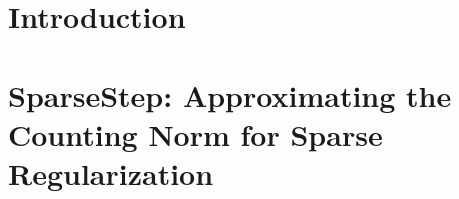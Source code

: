 \documentclass[a5paper, 11pt, openright]{book}
\begin{document}
\chapter{Introduction}
\blindtext
\blindtext

\chapter{SparseStep: Approximating the Counting Norm for Sparse 
	Regularization}
\blindtext
\blindtext
\end{document}
